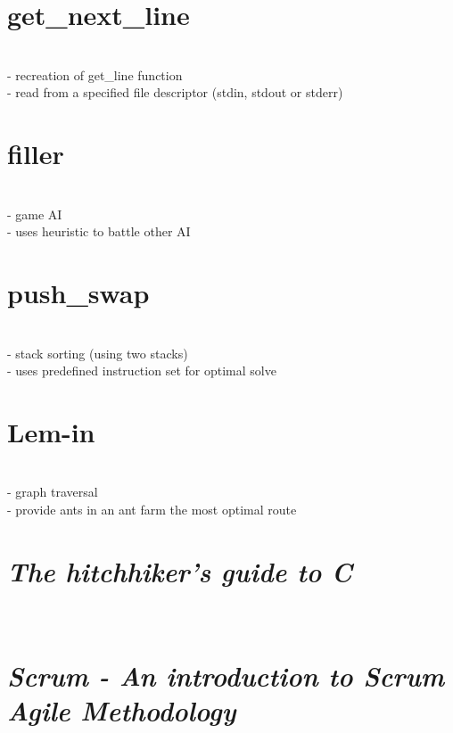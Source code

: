 \documentclass[10pt,a4paper]{altacv}
\begin{document}
\section*{get\_next\_line}
\\
- recreation of get\_line function \\
- read from a specified file descriptor (stdin, stdout or stderr)\\
\section*{filler}
\\
- game AI\\
- uses heuristic to battle other AI
\section*{push\_swap}
\\
- stack sorting (using two stacks)\\
- uses predefined instruction set for optimal solve
\section*{Lem-in}
\\
- graph traversal\\
- provide ants in an ant farm the most optimal route 

\section*{\emph{The hitchhiker's guide to C}}
\\
\section*{\emph{Scrum - An introduction to Scrum Agile Methodology}}
\\
\end{document}
